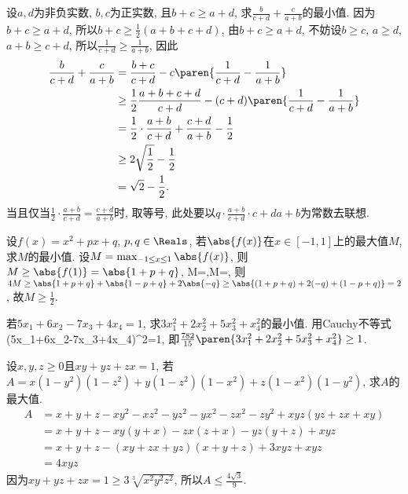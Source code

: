 \bq{}{}
设$a,d$为非负实数, $b,c$为正实数, 且$b+c\ge a+d$, 求$\frac{b}{c+d}+\frac{c}{a+b}$的最小值.
\eq
\ba
因为$b+c\ge a+d$, 所以$b+c\ge\frac12(a+b+c+d)$, 由$b+c\ge a+d$, 不妨设$b\ge c$, $a\ge d$, $a+b\ge c+d$,
所以$\frac1{c+d}\ge\frac1{a+b}$, 因此
\begin{align*}
 \frac{b}{c+d}+\frac{c}{a+b}&=\frac{b+c}{c+d}-c\paren{\frac1{c+d}-\frac1{a+b}}\\
  &\ge\frac12\frac{a+b+c+d}{c+d}-(c+d)\paren{\frac1{c+d}-\frac1{a+b}}\\
  &=\frac12\cdot\frac{a+b}{c+d}+\frac{c+d}{a+b}-\frac12\\
  &\ge2\sqrt{\frac12}-\frac12\\
  &=\sqrt{2}-\frac12.
\end{align*}
当且仅当$\frac12\cdot\frac{a+b}{c+d}=\frac{c+d}{a+b}$时, 取等号, 此处要以$q\cdot\frac{a+b}{c+d}\cdot{c+d}{a+b}$为常数去联想.
\ea

\bq{}{}
设$f(x)=x^2+px+q$, $p,q\in\Reals$, 若$\abs{f(x)}$在$x\in[-1,1]$上的最大值$M$, 求$M$的最小值.
\eq
\ba
设$M=\max_{-1\le x\le 1}\abs{f(x)}$, 则$M\ge\abs{f(1)}=\abs{1+p+q}$,
\bee
M\ge{}=,\quad M\ge{}=,
\eee
则$4M\ge\abs{1+p+q}+\abs{1-p+q}+2\abs{-q}\ge\abs{(1+p+q)+2(-q)+(1-p+q)}=2$, 故$M\ge\frac12$.
\ea

\bq{}{}
若$5x_1+6x_2-7x_3+4x_4=1$, 求$3x_1^2+2x_2^2+5x_3^2+x_4^2$的最小值.
\eq
\ba
用Cauchy不等式
\bee
{}
  \ge(5x_1+6x_2-7x_3+4x_4)^2=1,
\eee
即$\frac{782}{15}\paren{3x_1^2+2x_2^2+5x_3^2+x_4^2}\ge1$.
\ea

\bq{}{}
设$x,y,z\ge0$且$xy+yz+zx=1$, 若$A=x(1-y^2)(1-z^2)+y(1-z^2)(1-x^2)+z(1-x^2)(1-y^2)$, 求$A$的最大值.
\eq
\ba
\begin{align*}
 A&=x+y+z-xy^2-xz^2-yz^2-yx^2-zx^2-zy^2+xyz(yz+zx+xy)\\
  &=x+y+z-xy(y+x)-zx(z+x)-yz(y+z)+xyz\\
  &=x+y+z-(xy+zx+yz)(x+y+z)+3xyz+xyz\\
  &=4xyz
\end{align*}
因为$xy+yz+zx=1\ge3\sqrt[3]{x^2y^2z^2}$, 所以$A\le\frac{4\sqrt{3}}{9}$.
\ea

